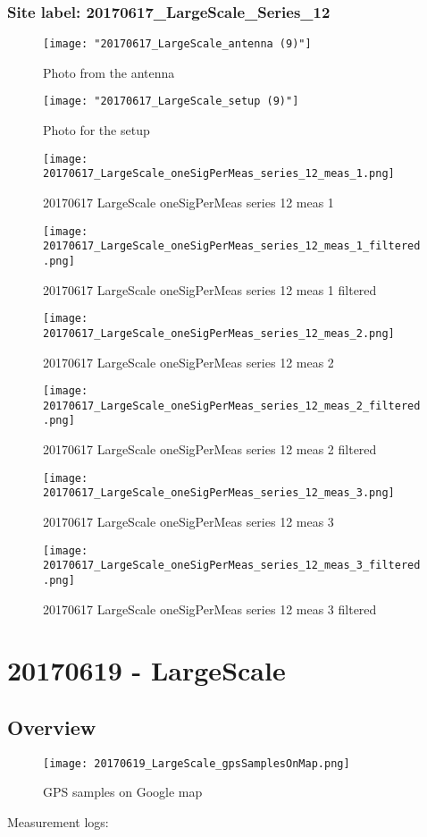 \subsubsection{Site label: 20170617\_LargeScale\_Series\_12}
\begin{figure}[ht] \caption{Photo from the antenna}
\texttt{[image: "20170617\_LargeScale\_antenna (9)"]}\centering\end{figure}
\begin{figure}[ht] \caption{Photo for the setup}
\texttt{[image: "20170617\_LargeScale\_setup (9)"]}\centering\end{figure}
\begin{figure}[ht] \caption{20170617 LargeScale oneSigPerMeas series 12 meas 1}
\texttt{[image: 20170617\_LargeScale\_oneSigPerMeas\_series\_12\_meas\_1.png]}\centering\end{figure}
\begin{figure}[ht] \caption{20170617 LargeScale oneSigPerMeas series 12 meas 1 filtered}
\texttt{[image: 20170617\_LargeScale\_oneSigPerMeas\_series\_12\_meas\_1\_filtered.png]}\centering\end{figure}
\begin{figure}[ht] \caption{20170617 LargeScale oneSigPerMeas series 12 meas 2}
\texttt{[image: 20170617\_LargeScale\_oneSigPerMeas\_series\_12\_meas\_2.png]}\centering\end{figure}
\begin{figure}[ht] \caption{20170617 LargeScale oneSigPerMeas series 12 meas 2 filtered}
\texttt{[image: 20170617\_LargeScale\_oneSigPerMeas\_series\_12\_meas\_2\_filtered.png]}\centering\end{figure}
\begin{figure}[ht] \caption{20170617 LargeScale oneSigPerMeas series 12 meas 3}
\texttt{[image: 20170617\_LargeScale\_oneSigPerMeas\_series\_12\_meas\_3.png]}\centering\end{figure}
\begin{figure}[ht] \caption{20170617 LargeScale oneSigPerMeas series 12 meas 3 filtered}
\texttt{[image: 20170617\_LargeScale\_oneSigPerMeas\_series\_12\_meas\_3\_filtered.png]}\centering\end{figure}
\clearpage
\section{20170619 - LargeScale}
\subsection{Overview}
\begin{figure}[ht] \caption{GPS samples on Google map}
\texttt{[image: 20170619\_LargeScale\_gpsSamplesOnMap.png]}\centering\end{figure}
\begin{minipage}{\textwidth} Measurement logs:

 \end{minipage}
\clearpage
